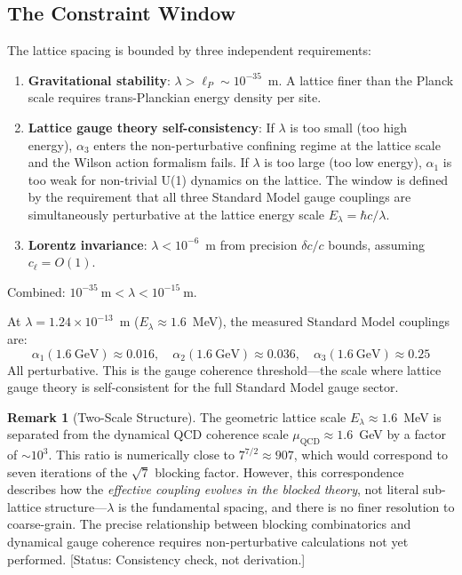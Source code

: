 \documentclass[12pt,a4paper]{article}
\theoremstyle{plain}
\theoremstyle{definition}
\newtheorem{remark}[theorem]{Remark}
\newcommand{\elabel}[1]{\textsf{\small [#1]}}
\begin{document}
\subsection{The Constraint Window}\label{sec:window}

The lattice spacing is bounded by three independent requirements:

\begin{enumerate}[label=(\roman*)]
    \item \textbf{Gravitational stability}: $\lambda > \ell_P \sim 10^{-35}$~m. A lattice finer than the Planck scale requires trans-Planckian energy density per site.
    
    \item \textbf{Lattice gauge theory self-consistency}: If $\lambda$ is too small (too high energy), $\alpha_3$ enters the non-perturbative confining regime at the lattice scale and the Wilson action formalism fails. If $\lambda$ is too large (too low energy), $\alpha_1$ is too weak for non-trivial U(1) dynamics on the lattice. The window is defined by the requirement that all three Standard Model gauge couplings are simultaneously perturbative at the lattice energy scale $E_\lambda = \hbar c/\lambda$.
    
    \item \textbf{Lorentz invariance}: $\lambda < 10^{-6}$~m from precision $\delta c/c$ bounds, assuming $c_\ell = O(1)$.
\end{enumerate}

Combined: $10^{-35}~\text{m} < \lambda < 10^{-15}~\text{m}$.

At $\lambda = 1.24 \times 10^{-13}$~m ($E_\lambda \approx 1.6$~MeV), the measured Standard Model couplings are:
\begin{equation}
\alpha_1(1.6~\text{GeV}) \approx 0.016, \quad
\alpha_2(1.6~\text{GeV}) \approx 0.036, \quad
\alpha_3(1.6~\text{GeV}) \approx 0.25
\end{equation}
All perturbative. This is the gauge coherence threshold---the scale where lattice gauge theory is self-consistent for the full Standard Model gauge sector.

\begin{remark}[Two-Scale Structure]\label{rem:two-scale}
The geometric lattice scale $E_\lambda \approx 1.6$~MeV is separated from the dynamical QCD coherence scale $\mu_{\mathrm{QCD}} \approx 1.6$~GeV by a factor of $\sim 10^3$. This ratio is numerically close to $7^{7/2} \approx 907$, which would correspond to seven iterations of the $\sqrt{7}$ blocking factor. However, this correspondence describes how the \emph{effective coupling evolves in the blocked theory}, not literal sub-lattice structure---$\lambda$ is the fundamental spacing, and there is no finer resolution to coarse-grain. The precise relationship between blocking combinatorics and dynamical gauge coherence requires non-perturbative calculations not yet performed. \elabel{Status: Consistency check, not derivation.}
\end{remark}
\end{document}
